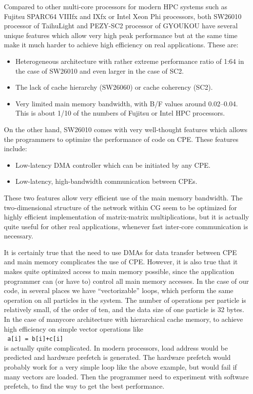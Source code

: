 \documentclass[conference]{IEEEtran}
\begin{document}
Compared to other multi-core processors for modern  HPC systems such
as Fujitsu SPARC64 VIIIfx and IXfx or Intel Xeon Phi processors,
both SW26010 processor  of TaihuLight and PEZY-SC2 processor of
GYOUKOU have several unique features which allow very high peak
performance but at the same time make it much harder to achieve high
efficiency on real applications. These are:
\begin{itemize}

  \item Heterogeneous architecture with rather extreme performance
    ratio of 1:64 in the case of SW26010 and even larger in the case
    of SC2.
  \item The lack of cache hierarchy (SW26060) or cache coherency (SC2).
  \item Very limited main memory bandwidth, with B/F values around
    0.02--0.04.  This is about 1/10 of the numbers of Fujitsu or Intel HPC processors.
    
\end{itemize}  

On the other hand, SW26010 comes with very well-thought features which
allows the programmers to optimize the performance of code on
CPE. These features include:
\begin{itemize}

\item Low-latency DMA controller which can be initiated by any CPE.
\item Low-latency, high-bandwidth communication between CPEs.
  
\end{itemize}  

These two features allow very efficient use of the main memory
bandwidth. The two-dimensional structure of the network within CG seem
to be optimized for highly efficient implementation of matrix-matrix
multiplications, but it is actually quite useful for other real
applications, whenever fast inter-core communication is necessary.

It is certainly true that the need to use DMAs for data transfer
between CPE and main memory complicates the use of CPE. However, it is
also true that it makes quite optimized access to main memory
possible, since the application programmer can (or have to) control
all main memory accesses. In the case of our code, in several places
we have ``vectorizable'' loops, which perform the same operation on all
particles in the system. The number of operations per particle is
relatively small, of the order of ten, and the data size of one
particle is 32 bytes. In the case of manycore architecture with
hierarchical cache memory, to achieve high efficiency on simple vector
operations like 
\\
{\tt \hspace*{1em} a[i] =   b[i]+c[i]}
\\
is actually quite complicated. In modern processors, load address
would be predicted and hardware prefetch is generated. The hardware
prefetch would probably work for a very simple loop like the above
example, but would fail if many vectors are loaded. Then the
programmer need to experiment with software prefetch, to find the way
to get  the best performance. 
\end{document}
